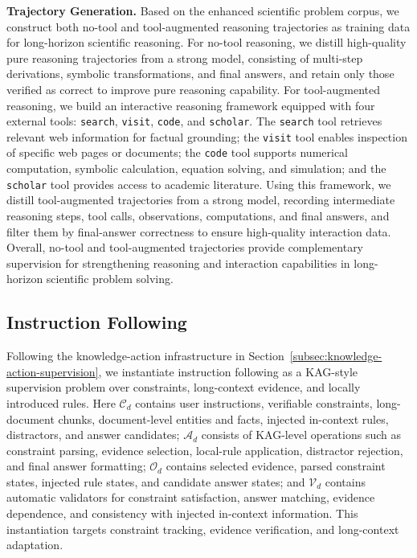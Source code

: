 \documentclass{llmxive}
\begin{document}
\textbf{Trajectory Generation.} Based on the enhanced scientific problem corpus, we construct both no-tool and tool-augmented reasoning trajectories as training data for long-horizon scientific reasoning. For no-tool reasoning, we distill high-quality pure reasoning trajectories from a strong model, consisting of multi-step derivations, symbolic transformations, and final answers, and retain only those verified as correct to improve pure reasoning capability. For tool-augmented reasoning, we build an interactive reasoning framework equipped with four external tools: \texttt{search}, \texttt{visit}, \texttt{code}, and \texttt{scholar}. The \texttt{search} tool retrieves relevant web information for factual grounding; the \texttt{visit} tool enables inspection of specific web pages or documents; the \texttt{code} tool supports numerical computation, symbolic calculation, equation solving, and simulation; and the \texttt{scholar} tool provides access to academic literature. Using this framework, we distill tool-augmented trajectories from a strong model, recording intermediate reasoning steps, tool calls, observations, computations, and final answers, and filter them by final-answer correctness to ensure high-quality interaction data. Overall, no-tool and tool-augmented trajectories provide complementary supervision for strengthening reasoning and interaction capabilities in long-horizon scientific problem solving.

\subsection{Instruction Following}
\label{sec:if_data}

Following the knowledge-action infrastructure in Section~\ref{subsec:knowledge-action-supervision}, we instantiate instruction following as a KAG-style supervision problem over constraints, long-context evidence, and locally introduced rules. Here $\mathcal{C}_d$ contains user instructions, verifiable constraints, long-document chunks, document-level entities and facts, injected in-context rules, distractors, and answer candidates; $\mathcal{A}_d$ consists of KAG-level operations such as constraint parsing, evidence selection, local-rule application, distractor rejection, and final answer formatting; $\mathcal{O}_d$ contains selected evidence, parsed constraint states, injected rule states, and candidate answer states; and $\mathcal{V}_d$ contains automatic validators for constraint satisfaction, answer matching, evidence dependence, and consistency with injected in-context information. This instantiation targets constraint tracking, evidence verification, and long-context adaptation.
\end{document}
